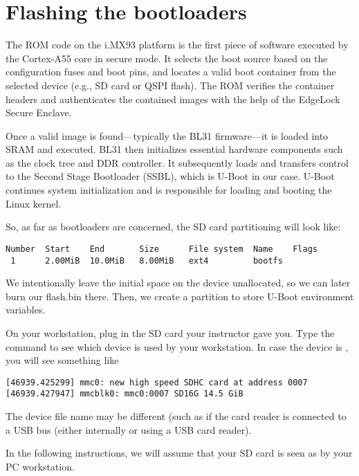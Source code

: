 \section{Flashing the bootloaders}

The ROM code on the i.MX93 platform is the first piece of software executed by
the Cortex-A55 core in secure mode. It selects the boot source based on the
configuration fuses and boot pins, and locates a valid boot container from the
selected device (e.g., SD card or QSPI flash). The ROM verifies the container
headers and authenticates the contained images with the help of the EdgeLock
Secure Enclave.

Once a valid image is found—typically the BL31 firmware—it is loaded into SRAM
and executed. BL31 then initializes essential hardware components such as the
clock tree and DDR controller. It subsequently loads and transfers control to
the Second Stage Bootloader (SSBL), which is U-Boot in our case. U-Boot
continues system initialization and is responsible for loading and booting the
Linux kernel.

So, as far as bootloaders are concerned, the SD card partitioning will
look like:

\begin{verbatim}
Number  Start    End       Size      File system  Name    Flags
 1      2.00MiB  10.0MiB   8.00MiB   ext4         bootfs

\end{verbatim}
We intentionally leave the initial space on the device unallocated, so we can
later burn our flash.bin there. Then, we create a partition to store U-Boot
environment variables.

On your workstation, plug in the SD card your instructor gave you. Type
the  command to see which device is used by your
workstation. In case the device is , you will see
something like

\begin{verbatim}
[46939.425299] mmc0: new high speed SDHC card at address 0007
[46939.427947] mmcblk0: mmc0:0007 SD16G 14.5 GiB
\end{verbatim}

The device file name may be different (such as 
if the card reader is connected to a USB bus (either internally
or using a USB card reader).

In the following instructions, we will assume that your SD card is
seen as  by your PC workstation.

